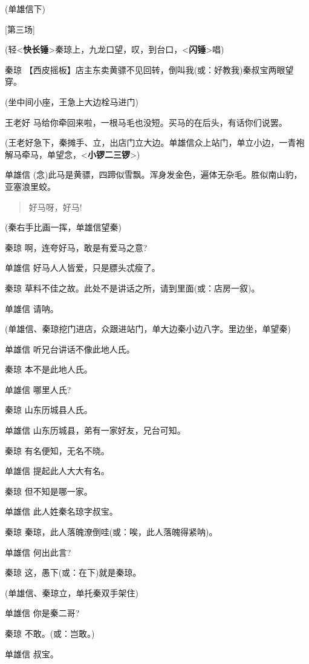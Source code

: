 (单雄信下)

{[}第三场{]}

(轻\textless{}\textbf{快长锤}\textgreater{}秦琼上，九龙口望，叹，到台口，\textless{}\textbf{闪锤}\textgreater{}唱)

秦琼
【西皮摇板】店主东卖黄骠不见回转，倒叫我(或：好教我)秦叔宝两眼望穿。

(坐中间小座，王急上大边栓马进门)

王老好 马给你牵回来啦，一根马毛也没短。买马的在后头，有话你们说罢。

(王老好急下，秦摊手、立，出店门立大边。单雄信众上站门，单立小边，一青袍解马牵马，单望念，\textless{}\textbf{小锣二三锣}\textgreater{})

单雄信
(念)此马是黄骠，四蹄似雪飘。浑身发金色，遍体无杂毛。胜似南山豹，亚塞浪里蛟。

\begin{quote}
好马呀，好马!
\end{quote}

(秦右手比画一挥，单雄信望秦)

秦琼 啊，连夸好马，敢是有爱马之意?

单雄信 好马人人皆爱，只是膘头忒瘦了。

秦琼 草料不佳之故。此处不是讲话之所，请到里面(或：店房一叙)。

单雄信 请呐。

(单雄信、秦琼挖门进店，众跟进站门，单大边秦小边八字。里边坐，单望秦)

单雄信 听兄台讲话不像此地人氏。

秦琼 本不是此地人氏。

单雄信 哪里人氏?

秦琼 山东历城县人氏。

单雄信 山东历城县，弟有一家好友，兄台可知。

秦琼 有名便知，无名不晓。

单雄信 提起此人大大有名。

秦琼 但不知是哪一家。

单雄信 此人姓秦名琼字叔宝。

秦琼 秦琼，此人落魄潦倒哇(或：唉，此人落魄得紧呐)。

单雄信 何出此言?

秦琼 这，愚下(或：在下)就是秦琼。

(单雄信、秦琼立，单托秦双手架住)

单雄信 你是秦二哥?

秦琼 不敢。(或：岂敢。)

单雄信 叔宝。

